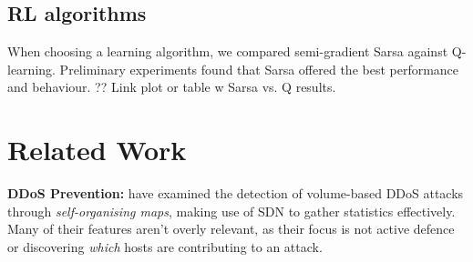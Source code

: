 \documentclass[10pt, times, conference, letterpaper]{IEEEtran}
\newcommand{\fakepara}[1]{\noindent\textbf{#1:}}
\begin{document}
%

\subsection{RL algorithms}
When choosing a learning algorithm, we compared semi-gradient Sarsa against Q-learning.
Preliminary experiments found that Sarsa offered the best performance and behaviour.
?? Link plot or table w Sarsa vs. Q results.

\section{Related Work}\label{sec:related-work}


\fakepara{DDoS Prevention}
\Textcite{DBLP:conf/lcn/BragaMP10} have examined the detection of volume-based DDoS attacks through \emph{self-organising maps}, making use of SDN to gather statistics effectively.
Many of their features aren't overly relevant, as their focus is not active defence or discovering \emph{which} hosts are contributing to an attack.
\end{document}
